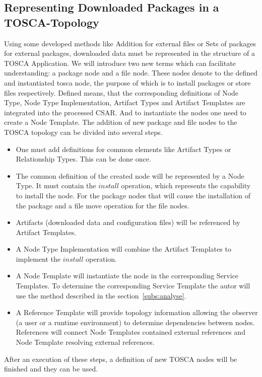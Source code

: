 \subsection{Representing Downloaded Packages in a TOSCA-Topology} \label{subs:repres}
Using some developed methods like Addition for external files or Sets of packages for external packages, downloaded data must be represented in the structure of a TOSCA Application.
We will introduce two new terms which can facilitate understanding: a package node and a file node.
These nodes denote to the defined and instantiated \gls{tosca} node, the purpose of which is to install packages or store files respectively.
Defined means, that the corresponding definitions of Node Type, Node Type Implementation, Artifact Types and Artifact Templates are integrated into the processed CSAR.
And to instantiate the nodes one need to create a Node Template.
The addition of new package and file nodes to the TOSCA topology can be divided into several steps.
\begin{itemize}
	\item One must add definitions for common elements like Artifact Types or Relationship Types. 
		This can be done once.
	\item The common definition of the created node will be represented by a Node Type.   
		It must contain the $install$ operation, which represents the capability to install the node.
		For the package nodes that will cause the installation of the package and a file move operation for the file nodes.
	\item Artifacts (downloaded data and configuration files) will be referenced by Artifact Templates.
	\item A Node Type Implementation will combine the Artifact Templates to implement the $install$ operation.
	\item A Node Template will instantiate the node in the corresponding Service Templates.
		To determine the corresponding Service Template the autor will use the method described in the section~\ref{subs:analyse}.
	\item A Reference Template will provide topology information allowing the observer (a user or a runtime environment) to determine dependencies between nodes.
		References will connect Node Templates contained external references and Node Template resolving external references.
\end{itemize}
After an execution of these steps, a definition of new TOSCA nodes will be finished and they can be used.

